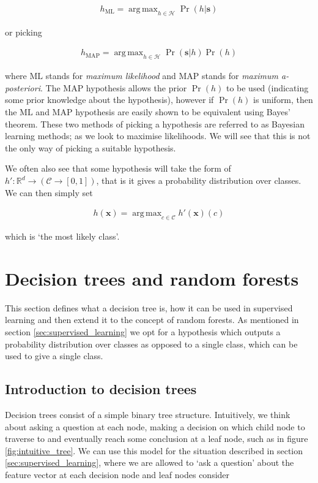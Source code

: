 \documentclass[12pt,twoside,notitlepage]{report}
\newcommand{\vc}[1]{\mathbf{#1}}
\newcommand{\cl}[1]{\mathcal{#1}}
\newcommand{\bb}[1]{\mathbb{#1}}
\DeclareMathOperator*{\argmax}{arg\,max}
\newcommand{\ML}{\text{ML}}
\newcommand{\MAP}{\text{MAP}}
\begin{document}
        \begin{align}
            h_{\ML} = \argmax_{h\in\cl{H}} \Pr(h | \vc{s})
        \end{align}

        or picking

        \begin{align}
            h_{\MAP} = \argmax_{h\in\cl{H}} \Pr(\vc{s} | h) \Pr(h)
        \end{align} 

        where $\ML$ stands for \textit{maximum likelihood} and $\MAP$ stands for \textit{maximum a-posteriori}. The $\MAP$ 
        hypothesis allows the prior $\Pr(h)$ to be used (indicating some prior knowledge about the hypothesis), however 
        if $\Pr(h)$ is uniform, then the $\ML$ and $\MAP$ hypothesis are easily shown to be equivalent using Bayes' theorem. 
        These two methods of picking a hypothesis are referred to as Bayesian learning methods; as we look to maximise 
        likelihoods. We will see that this is not the only way of picking a suitable hypothesis. \cite{russell1995modern}

        We often also see that some hypothesis will take the form of $h':\bb{R}^d \rightarrow (\cl{C} \rightarrow [0,1])$, 
        that is it gives a probability distribution over classes. We can then simply set 
        
        \begin{align}
            h(\vc{x}) = \argmax_{c\in\cl{C}} h'(\vc{x})(c)
        \end{align}

        which is `the most likely class'.

        



    \section{Decision trees and random forests} \label{sec:rand_forest}
        This section defines what a decision tree is, how it can be used in supervised learning and then extend it to 
        the concept of random forests. As mentioned in section \ref{sec:supervised_learning} we opt for a hypothesis 
        which outputs a probability distribution over classes as opposed to a single class, which 
        can be used to give a single class.

        \subsection{Introduction to decision trees} \label{sec:intro_decision_trees}
            Decision trees consist of a simple binary tree structure. Intuitively, we think about asking a question at each 
            node, making a decision on which child node to traverse to and eventually reach some conclusion at a leaf node, such 
            as in figure \ref{fig:intuitive_tree}. We can use this model for the situation described in section 
            \ref{sec:supervised_learning}, where we are allowed to `ask a question' about the feature vector at each 
            decision node and leaf nodes consider
\end{document}
